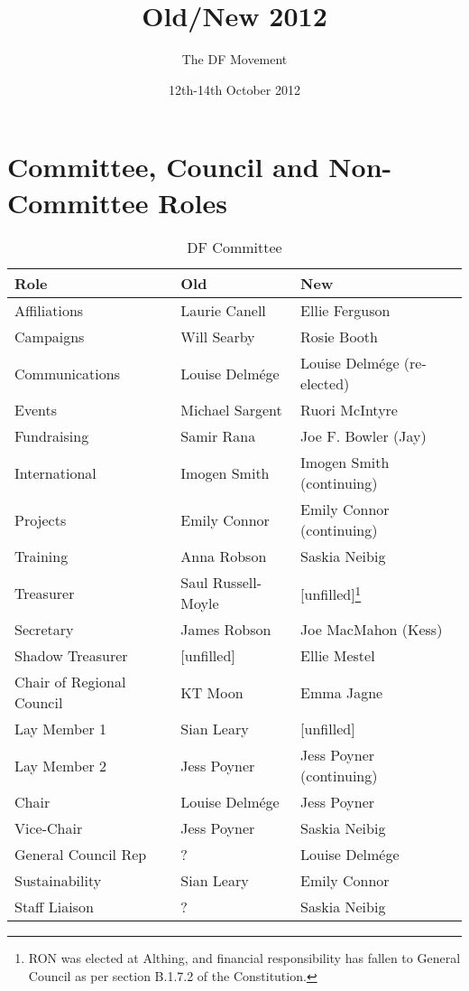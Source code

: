 \documentclass[a4paper, 12pt]{article}
\title{Old/New 2012}
\author{The DF Movement}
\date{12th-14th October 2012}
\begin{document}
\maketitle
\tableofcontents

\clearpage

\section{Committee, Council and Non-Committee Roles}
\begin{savenotes}
\begin{table}[H]
\centering

\begin{tabular}{ l || l | l }
\textbf{Role}				& \textbf{Old}			& \textbf{New} \\ \hline
Affiliations				& Laurie Canell			& Ellie Ferguson \\
Campaigns					& Will Searby			& Rosie Booth \\
Communications				& Louise Delmége		& Louise Delmége (re-elected) \\
Events						& Michael Sargent		& Ruori McIntyre \\
Fundraising					& Samir Rana			& Joe F. Bowler (Jay) \\
International				& Imogen Smith			& Imogen Smith (continuing) \\
Projects					& Emily Connor			& Emily Connor (continuing) \\
Training					& Anna Robson			& Saskia Neibig \\
Treasurer					& Saul Russell-Moyle	& [unfilled]\footnote{RON was elected at Althing, and financial responsibility has fallen to General Council as per section B.1.7.2 of the Constitution.} \\
Secretary					& James Robson			& Joe MacMahon (Kess) \\
Shadow Treasurer			& [unfilled]			& Ellie Mestel \\
Chair of Regional Council	& KT Moon				& Emma Jagne \\
Lay Member 1				& Sian Leary			& [unfilled] \\
Lay Member 2				& Jess Poyner			& Jess Poyner (continuing) \\
Chair						& Louise Delmége		& Jess Poyner \\
Vice-Chair					& Jess Poyner			& Saskia Neibig \\
General Council Rep			& ?						& Louise Delmége \\
Sustainability				& Sian Leary			& Emily Connor \\
Staff Liaison				& ?						& Saskia Neibig \\
\end{tabular}
\caption{DF Committee}
\label{tab:ctte}
\end{table}
\end{savenotes}
\end{document}
